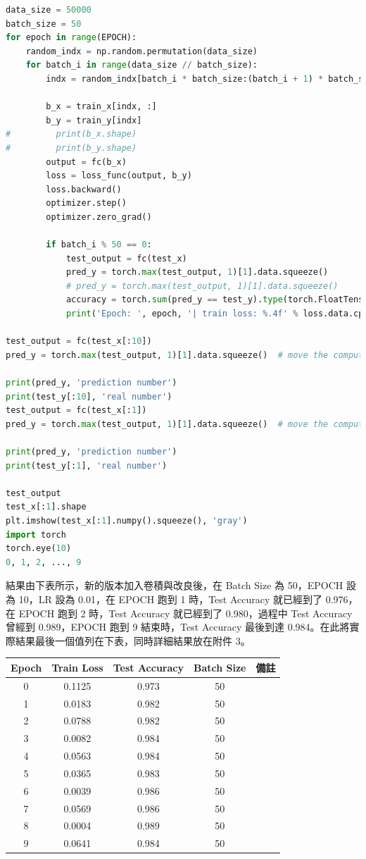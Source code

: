\documentclass[11pt,UTF8]{ctexart}
\begin{document}
\begin{lstlisting}[language={python}]
data_size = 50000
batch_size = 50
for epoch in range(EPOCH):
    random_indx = np.random.permutation(data_size)
    for batch_i in range(data_size // batch_size):
        indx = random_indx[batch_i * batch_size:(batch_i + 1) * batch_size]

        b_x = train_x[indx, :]
        b_y = train_y[indx]
#         print(b_x.shape)
#         print(b_y.shape)
        output = fc(b_x)
        loss = loss_func(output, b_y)
        loss.backward()
        optimizer.step()
        optimizer.zero_grad()

        if batch_i % 50 == 0:
            test_output = fc(test_x)
            pred_y = torch.max(test_output, 1)[1].data.squeeze()
            # pred_y = torch.max(test_output, 1)[1].data.squeeze()
            accuracy = torch.sum(pred_y == test_y).type(torch.FloatTensor) / test_y.size(0)
            print('Epoch: ', epoch, '| train loss: %.4f' % loss.data.cpu().numpy(), '| test accuracy: %.3f' % accuracy)

test_output = fc(test_x[:10])
pred_y = torch.max(test_output, 1)[1].data.squeeze()  # move the computation in GPU

print(pred_y, 'prediction number')
print(test_y[:10], 'real number')
test_output = fc(test_x[:1])
pred_y = torch.max(test_output, 1)[1].data.squeeze()  # move the computation in GPU

print(pred_y, 'prediction number')
print(test_y[:1], 'real number')

test_output
test_x[:1].shape
plt.imshow(test_x[:1].numpy().squeeze(), 'gray')
import torch
torch.eye(10)
0, 1, 2, ..., 9
	\end{lstlisting}

結果由下表所示，新的版本加入卷積與改良後，在 Batch Size 為 50，EPOCH 設為 10，LR 設為 0.01，在 EPOCH 跑到 1 時，Test Accuracy 就已經到了 0.976，在 EPOCH 跑到 2 時，Test Accuracy 就已經到了 0.980，過程中 Test Accuracy 曾經到 0.989，EPOCH 跑到 9 結束時，Test Accuracy 最後到達 0.984。在此將實際結果最後一個值列在下表，同時詳細結果放在附件 3。

\begin{center}
\begin{tabular}{ccccc}
\hline
Epoch & Train Loss & Test Accuracy & Batch Size & 備註 \\
\hline
0 & 0.1125 & 0.973 & 50 &  \\
1 & 0.0183 & 0.982 & 50 &  \\
2 & 0.0788 & 0.982 & 50 & \\
3 & 0.0082 & 0.984 & 50 &  \\
4 & 0.0563 & 0.984 & 50 &  \\
5 & 0.0365 & 0.983 & 50 &  \\
6 & 0.0039 & 0.986 & 50 &  \\
7 & 0.0569 & 0.986 & 50 &  \\
8 & 0.0004 & 0.989 & 50 &  \\
9 & 0.0641 & 0.984 & 50 &  \\
\hline
\end{tabular}
\end{center}
\end{document}
